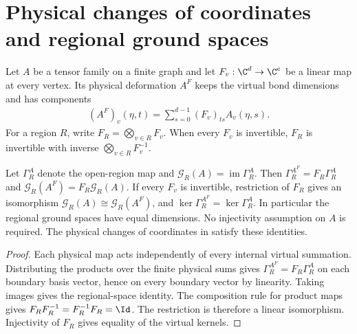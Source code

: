 \section{Physical changes of coordinates and regional ground spaces}%
\label{sec:peps_region_physical_deformation}

\begin{definition}%
    \label{def:peps_physical_deformation}
    \leanok
    Let $A$ be a tensor family on a finite graph and let
    $F_v:\C^d\to\C^e$ be a linear map at every vertex.
    Its physical deformation $A^F$ keeps the virtual bond dimensions
    and has components
    \begin{align}
        (A^F)_v(\eta,t)=\sum_{s=0}^{d-1}(F_v)_{ts}A_v(\eta,s).
    \end{align}
    For a region $R$, write $F_R=\bigotimes_{v\in R}F_v$.
    When every $F_v$ is invertible, $F_R$ is invertible with inverse
    $\bigotimes_{v\in R}F_v^{-1}$.
\end{definition}

\begin{lemma}%
    \label{thm:peps_region_physical_deformation}
    \leanok
    Let $\Gamma_R^A$ denote the open-region map and
    $\mathcal G_R(A)=\operatorname{im}\Gamma_R^A$.
    Then $\Gamma_R^{A^F}=F_R\Gamma_R^A$ and
    $\mathcal G_R(A^F)=F_R\mathcal G_R(A)$.
    If every $F_v$ is invertible, restriction of $F_R$ gives an
    isomorphism $\mathcal G_R(A)\cong\mathcal G_R(A^F)$,
    and $\ker\Gamma_R^{A^F}=\ker\Gamma_R^A$.
    In particular the regional ground spaces have equal dimensions.
    No injectivity assumption on $A$ is required.
    The physical changes of coordinates in
    \cite[\S6.1, accessible virtual coordinates]{Schuch2010PEPS}
    satisfy these identities.
\end{lemma}

\begin{proof}\leanok
    Each physical map acts independently of every internal virtual
    summation. Distributing the products over the finite physical sums
    gives $\Gamma_R^{A^F}=F_R\Gamma_R^A$ on each boundary basis vector,
    hence on every boundary vector by linearity. Taking images gives
    the regional-space identity. The composition rule for product maps
    gives $F_RF_R^{-1}=F_R^{-1}F_R=\Id$.
    The restriction is therefore a linear isomorphism. Injectivity of
    $F_R$ gives equality of the virtual kernels.
\end{proof}

